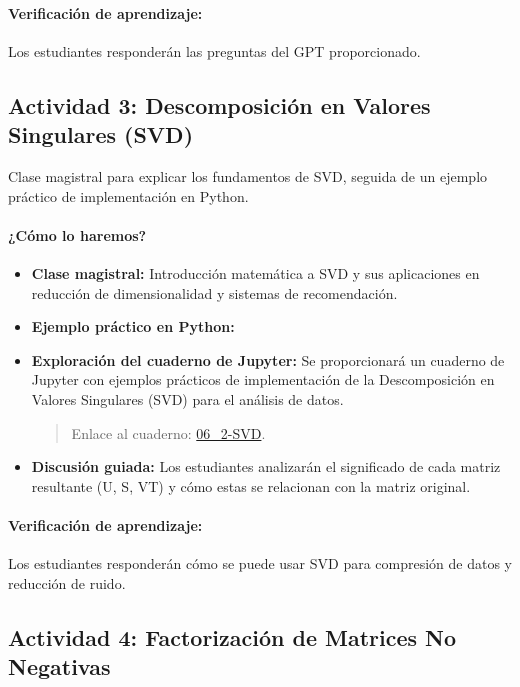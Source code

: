 \documentclass[a4,11pt]{aleph-notas}
\begin{document}
\paragraph{Verificación de aprendizaje:}  
Los estudiantes responderán las preguntas del GPT proporcionado.

\subsection*{Actividad 3: Descomposición en Valores Singulares (SVD)}

Clase magistral para explicar los fundamentos de SVD, seguida de un ejemplo práctico de implementación en Python.

\paragraph{¿Cómo lo haremos?}  
\begin{itemize}[leftmargin=*]
    \item \textbf{Clase magistral:}  
    Introducción matemática a SVD y sus aplicaciones en reducción de dimensionalidad y sistemas de recomendación.

    \item \textbf{Ejemplo práctico en Python:}  
    \item \textbf{Exploración del cuaderno de Jupyter:}  
       Se proporcionará un cuaderno de Jupyter con ejemplos prácticos de implementación de la Descomposición en Valores Singulares (SVD) para el análisis de datos.
    \begin{quote}
        Enlace al cuaderno: \href{https://colab.research.google.com/github/andres-merino/AprendizajeAutomaticoInicial-05-N0105/blob/main/2-Notebooks/06_2-SVD.ipynb}{06\_2-SVD}.
    \end{quote}
    \item \textbf{Discusión guiada:}  
    Los estudiantes analizarán el significado de cada matriz resultante (U, S, VT) y cómo estas se relacionan con la matriz original.
\end{itemize}

\paragraph{Verificación de aprendizaje:}  
Los estudiantes responderán cómo se puede usar SVD para compresión de datos y reducción de ruido.

\subsection*{Actividad 4: Factorización de Matrices No Negativas}
\end{document}
